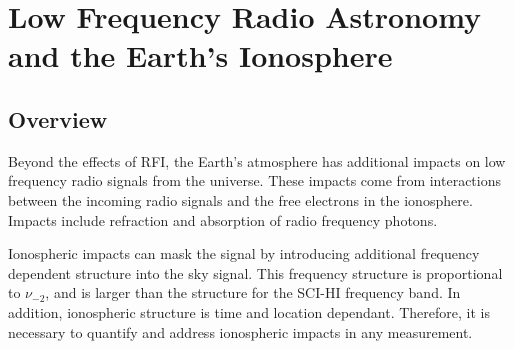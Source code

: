 \chapter{Low Frequency Radio Astronomy and the Earth's Ionosphere}\label{Ch:Iono}


\section{Overview}

Beyond the effects of RFI, the Earth's atmosphere has additional impacts on low frequency radio signals from the universe. These impacts come from interactions between the incoming radio signals and the free electrons in the ionosphere. Impacts include refraction and absorption of radio frequency photons. 

Ionospheric impacts can mask the \cm signal by introducing additional frequency dependent structure into the sky signal. This frequency structure is proportional to $\nu_{-2}$, and is larger than the \cm structure for the SCI-HI frequency band. In addition, ionospheric structure is time and location dependant. Therefore, it is necessary to quantify and address ionospheric impacts in any \cm measurement. 

